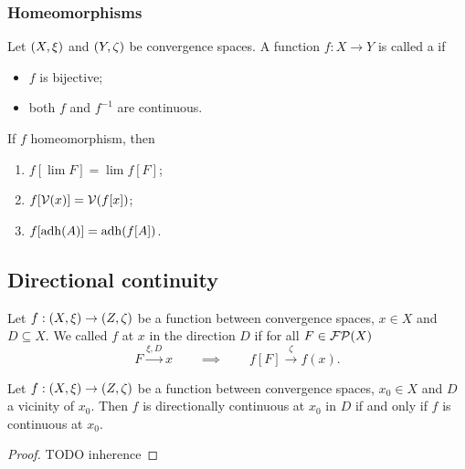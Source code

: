 \subsubsection{Homeomorphisms}
\begin{definition}
Let $\left( X,\xi \right)$ and $\left( Y,\zeta \right)$ be convergence spaces. A function $f: X\to Y$ is called a  if
\begin{itemize}
\item $f$ is bijective;
\item both $f$ and $f^{-1}$ are continuous.
\end{itemize}
\end{definition}

\begin{proposition} \label{homeomorphismPreservation}
If $f$ homeomorphism, then
\begin{enumerate}
\item $f[\lim F] = \lim f[F]$;
\item $f[\operatorname{\mathcal{V}}(x)] = \operatorname{\mathcal{V}}(f[x])$;
\item $f[\operatorname{adh}(A)] = \operatorname{adh}(f[A])$.
\end{enumerate}
\end{proposition}


\subsection{Directional continuity}
\begin{definition}
Let $f: \left( X,\xi \right) \to \left( Z,\zeta \right)$ be a function between convergence spaces, $x\in X$ and $D\subseteq X$. We called $f$  at $x$ in the direction $D$ if for all $F\in\operatorname{\mathcal{FP}}(X)$
\[ F \overset{\xi,D}{\longrightarrow} x \qquad \implies \qquad f[F] \overset{\zeta}{\longrightarrow} f(x). \]
\end{definition}

\begin{lemma}
Let $f: \left( X,\xi \right) \to \left( Z,\zeta \right)$ be a function between convergence spaces, $x_0\in X$ and $D$ a vicinity of $x_0$. Then $f$ is directionally continuous at $x_0$ in $D$ \textup{if and only if} $f$ is continuous at $x_0$.
\end{lemma}
\begin{proof}
TODO inherence
\end{proof}

